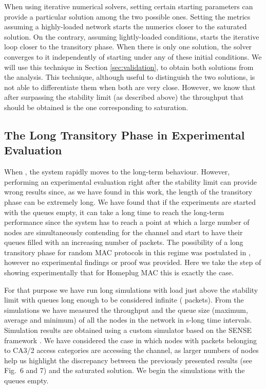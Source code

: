 \documentclass[preprint,12pt]{elsarticle}
\begin{document}
When using iterative numerical solvers, setting certain starting parameters can provide a particular solution among the two possible ones. Setting the metrics assuming a highly-loaded network starts the numerics closer to the saturated solution. On the contrary, assuming lightly-loaded conditions, starts the iterative loop closer to the transitory phase. When there is only one solution, the solver converges to it independently of starting under any of these initial conditions. We will use this technique in Section \ref{sec:validation}, to obtain both solutions from the analysis. This technique, although useful to distinguish the two solutions, is not able to differentiate them when both are very close. However, we know that after surpassing the stability limit (as described above) the throughput that should be obtained is the one corresponding to saturation. 

\subsection{The Long Transitory Phase in Experimental Evaluation}

When , the system rapidly moves to the long-term behaviour. However, performing an experimental evaluation right after the stability limit can provide wrong results since, as we have found in this work, the length of the transitory phase can be extremely long. We have found that if the experiments are started with the queues empty, it can take a long time to reach the long-term performance since the system has to reach a point at which a large number of nodes are simultaneously contending for the channel and start to have their queues filled with an increasing number of packets. The possibility of a long transitory phase for random MAC protocols in this regime was postulated in \cite{suleiman2008impact}, however no experimental findings or proof was provided. Here we take the step of showing experimentally that for Homeplug MAC this is exactly the case. 

For that purpose we have run long simulations with load just above the stability limit with queues long enough to be considered infinite ( packets). From the simulations we have measured the throughput and the queue size (maximum, average and minimum) of all the nodes in the network in s-long time intervals. Simulation results are obtained using a custom simulator based on the SENSE framework \cite{chen2004sense}. We have considered the case in which  nodes with packets belonging to CA3/2 access categories are accessing the channel, as larger numbers of nodes help us highlight the discrepancy between the previously presented results (see \cite{chung2006performance} Fig.~6 and 7) and the saturated solution. We begin the simulations with the queues empty.
\end{document}
